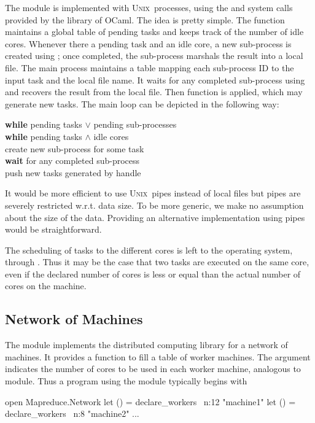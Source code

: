 \documentclass[preprint]{sigplanconf}
\newcommand{\Ocaml}{OCaml}
\newcommand{\unix}{\textsc{Unix}}
\begin{document}
The  module is implemented with \unix\ processes, using the
 and  system calls provided by the  library
of \Ocaml. The idea is pretty simple. 
The  function maintains a global table of pending tasks
and keeps track of the number of idle cores.
Whenever there a pending task and an idle core, 
a new sub-process is created using ; 
once completed, the sub-process marshals the result 
into a local file. The main process maintains a table
mapping each sub-process ID to the input task and the local file
name. It waits for any completed sub-process using 
and recovers the result from the local file. Then function 
is applied, which may generate new tasks.
The main loop can be depicted in the following way:
\begin{flushleft}
  \quad  \textbf{while} pending tasks $\lor$ pending sub-processes \\
  \quad  \quad \textbf{while} pending tasks $\land$ idle cores \\
  \quad  \quad \quad create new sub-process for some task \\
  \quad  \quad \textbf{wait} for any completed sub-process \\
  \quad  \quad \quad push new tasks generated by handle \\
\end{flushleft}

It would be more efficient to use \unix\ pipes instead of local files
but pipes are severely restricted w.r.t. data size. To be more
generic, we make no assumption about the size of the data. Providing
an alternative implementation using pipes would be straightforward.

The scheduling of tasks to the different cores is left to the
operating system, through . Thus it may be the case that
two tasks are executed on the same core, even if the declared number
of cores is less or equal than the actual number of cores on the machine.

\subsection{Network of Machines}

The  module implements the distributed computing library for
a network of machines. 
It provides a function  
to fill a table of worker machines. The argument  indicates the
number of cores to be used in each worker machine, analogous to 
 module. Thus a program using the  module
typically begins with
\begin{ocaml}
open Mapreduce.Network
let () = declare_workers ~n:12 "machine1"
let () = declare_workers ~n:8  "machine2"
...
\end{ocaml}
\end{document}
